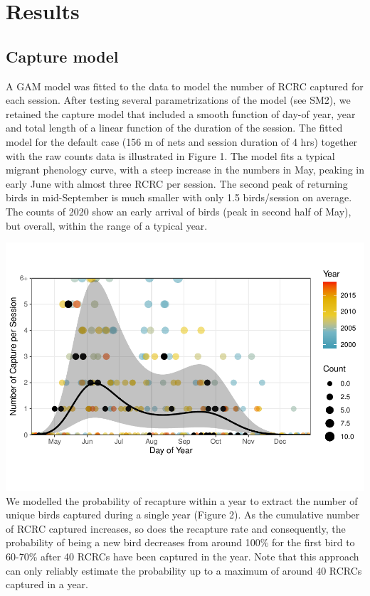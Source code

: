 \documentclass[]{interact}
\theoremstyle{plain}%
\theoremstyle{definition}
\theoremstyle{remark}
\begin{document}
\hypertarget{results}{%
\section{Results}\label{results}}

\hypertarget{capture-model-1}{%
\subsection{Capture model}\label{capture-model-1}}

A GAM model was fitted to the data to model the number of RCRC captured
for each session. After testing several parametrizations of the model
(see SM2), we retained the capture model that included a smooth function
of day-of year, year and total length of a linear function of the
duration of the session. The fitted model for the default case (156 m of
nets and session duration of 4 hrs) together with the raw counts data is
illustrated in Figure 1. The model fits a typical migrant phenology
curve, with a steep increase in the numbers in May, peaking in early
June with almost three RCRC per session. The second peak of returning
birds in mid-September is much smaller with only 1.5 birds/session on
average. The counts of 2020 show an early arrival of birds (peak in
second half of May), but overall, within the range of a typical year.

\includegraphics{manuscript_files/figure-latex/seasonal-variation-counts-1.pdf}
We modelled the probability of recapture within a year to extract the
number of unique birds captured during a single year (Figure 2). As the
cumulative number of RCRC captured increases, so does the recapture rate
and consequently, the probability of being a new bird decreases from
around 100\% for the first bird to 60-70\% after 40 RCRCs have been
captured in the year. Note that this approach can only reliably estimate
the probability up to a maximum of around 40 RCRCs captured in a year.
\end{document}
